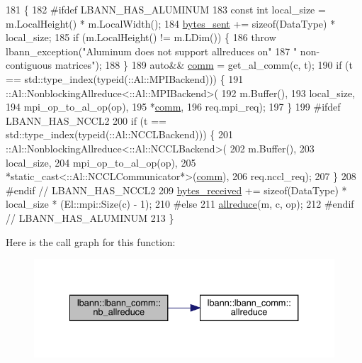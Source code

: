\begin{DoxyCode}
181                                                \{
182 \textcolor{preprocessor}{#ifdef LBANN\_HAS\_ALUMINUM}
183   \textcolor{keyword}{const} \textcolor{keywordtype}{int} local\_size = m.LocalHeight() * m.LocalWidth();
184   \hyperlink{classlbann_1_1lbann__comm_ad1f146ae7337ece6266fd307944928e0}{bytes\_sent} += \textcolor{keyword}{sizeof}(DataType) * local\_size;
185   \textcolor{keywordflow}{if} (m.LocalHeight() != m.LDim()) \{
186     \textcolor{keywordflow}{throw} lbann\_exception(\textcolor{stringliteral}{"Aluminum does not support allreduces on"}
187                           \textcolor{stringliteral}{" non-contiguous matrices"});
188   \}
189   \textcolor{keyword}{auto}&& \hyperlink{file__io_8cpp_ab048c6f9fcbcfaa57ce68b00263dbebe}{comm} = get\_al\_comm(c, t);
190   \textcolor{keywordflow}{if} (t == std::type\_index(\textcolor{keyword}{typeid}(::Al::MPIBackend))) \{
191     ::Al::NonblockingAllreduce<::Al::MPIBackend>(
192       m.Buffer(),
193       local\_size,
194       mpi\_op\_to\_al\_op(op),
195       *\hyperlink{file__io_8cpp_ab048c6f9fcbcfaa57ce68b00263dbebe}{comm},
196       req.mpi\_req);
197   \}
199 \textcolor{preprocessor}{#ifdef LBANN\_HAS\_NCCL2}
200   \textcolor{keywordflow}{if} (t == std::type\_index(\textcolor{keyword}{typeid}(::Al::NCCLBackend))) \{
201     ::Al::NonblockingAllreduce<::Al::NCCLBackend>(
202       m.Buffer(),
203       local\_size,
204       mpi\_op\_to\_al\_op(op),
205       *\textcolor{keyword}{static\_cast<}::Al::NCCLCommunicator*\textcolor{keyword}{>}(\hyperlink{file__io_8cpp_ab048c6f9fcbcfaa57ce68b00263dbebe}{comm}),
206       req.nccl\_req);
207   \}
208 \textcolor{preprocessor}{#endif // LBANN\_HAS\_NCCL2}
209   \hyperlink{classlbann_1_1lbann__comm_afb99f57f7eafc0695bf28e6c26a8120f}{bytes\_received} += \textcolor{keyword}{sizeof}(DataType) * local\_size * (El::mpi::Size(c) - 1);
210 \textcolor{preprocessor}{#else}
211   \hyperlink{classlbann_1_1lbann__comm_af5631e5f0f54e4df4958eba9df2599ef}{allreduce}(m, c, op);
212 \textcolor{preprocessor}{#endif // LBANN\_HAS\_ALUMINUM}
213 \}
\end{DoxyCode}
Here is the call graph for this function\+:\nopagebreak
\begin{figure}[H]
\begin{center}
\leavevmode
\includegraphics[width=334pt]{classlbann_1_1lbann__comm_a2a7bb6cf3707366fc0671d8894ca30ea_cgraph}
\end{center}
\end{figure}
